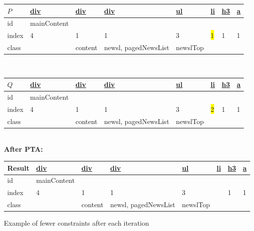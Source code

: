 \begin{figure}[htbp]
\centering
\small
	\begin{tabular}{|l l l l l l l l|}
	\hline
	$P$ & \url{div}	&	\url{div}	&	\url{div}	&	\url{ul}	&	\url{li}	&	\url{h3}	&	\url{a} \\\hline
	id		&mainContent&	&	&	&	&	&	 \\
	index	&	4	&	1		&	1	&	3	&	\colorbox{yellow}{1}	&	1	&	1 \\
	class	&		&	content	&	newsl, pagedNewsList	&	newslTop &	&	& \\
	\hline
	\end{tabular} \\
	\begin{tabular}{|l l l l l l l l|}
	\hline
	$Q$ 	& \url{div}	&	\url{div}	&	\url{div}	&	\url{ul}	&	\url{li}	&	\url{h3}	&	\url{a} \\\hline
	id		&mainContent&	&	&	&	&	&	 \\
	index	&	4	&	1		&	1	&	3	&	\colorbox{yellow}{2}	&	1	&	1 \\
	class	&		&	content	&	newsl, pagedNewsList	&	newslTop &	&	& \\
	\hline
	\end{tabular}\\
	\textbf{After PTA:}\\
	\begin{tabular}{|l l l l l l l l|}
	\hline
	Result 	& \url{div}	&	\url{div}	&	\url{div}	&	\url{ul}	&	\url{li}	&	\url{h3}	&	\url{a} \\\hline
	id		&mainContent&	&	&	&	&	&	 \\
	index	&	4	&	1		&	1	&	3	&		&	1	&	1 \\
	class	&		&	content	&	newsl, pagedNewsList	&	newslTop &	&	& \\
	\hline
	\end{tabular}
\caption{Example of fewer constraints after each iteration}
\label{fig:lcsexample}
\end{figure}